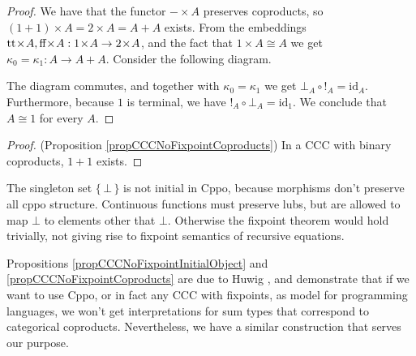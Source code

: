 \documentclass[a4paper]{article}
\newcommand{\arr}{\rightarrow}
\newcommand{\set}[1]{\{\,#1\,\}}
\newcommand{\product}{\!\times\!}
\begin{document}
\begin{proof}
We have that the functor $- \product A$ preserves coproducts, so $(1+1)\product
A = 2 \product A = A + A$ exists. From the embeddings $\true \product A, \false
\product A : 1 \product A \arr 2 \product A$, and the fact that $1 \product A
\cong A$ we get $\kappa_0 = \kappa_1 : A \arr A + A$. Consider the following
diagram.

\begin{center}
\end{center}
The diagram commutes, and together with $\kappa_0 = \kappa_1$ we get $\bot_A
\circ !_A = \text{id}_A$. Furthermore, because $1$ is terminal, we have $!_A
\circ \bot_A = \text{id}_1$. We conclude that $A \cong 1$ for every $A$.
\end{proof}

\begin{proof}
(Proposition \ref{propCCCNoFixpointCoproducts}) In a CCC with binary coproducts,
$1+1$ exists.
\end{proof}

The singleton set $\set{\bot}$ is not initial in Cppo, because morphisms don't
preserve all cppo structure. Continuous functions must preserve lubs, but are
allowed to map $\bot$ to elements other that $\bot$. Otherwise the fixpoint
theorem would hold trivially, not giving rise to fixpoint semantics of recursive
equations.

Propositions \ref{propCCCNoFixpointInitialObject} and
\ref{propCCCNoFixpointCoproducts} are due to Huwig \cite{Huwig1990}, and
demonstrate that if we want to use Cppo, or in fact any CCC with fixpoints,  as
model for programming languages, we won't get interpretations for sum types that
correspond to categorical coproducts. Nevertheless, we have a similar
construction that serves our purpose.
\end{document}
